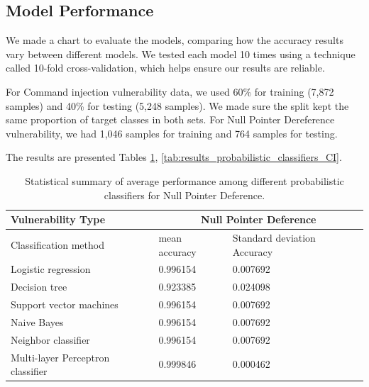\documentclass[journal,a4paper]{IEEEtran}
\begin{document}
\subsection{Model Performance}

We made a chart to evaluate the models, comparing how the accuracy results vary between different models. We tested each model 10 times using a technique called 10-fold cross-validation, which helps ensure our results are reliable.

For Command injection vulnerability data, we used 60\% for training (7,872 samples) and 40\% for testing (5,248 samples). We made sure the split kept the same proportion of target classes in both sets.
For Null Pointer Dereference vulnerability, we had 1,046 samples for training and 764 samples for testing.

The results are presented Tables \ref{tab:results_probabilistic_classifiers_NPD}, \ref{tab:results_probabilistic_classifiers_CI}. 


\begin{table}[!ht]
    \centering
    \caption{Statistical summary of average performance among different probabilistic classifiers for Null Pointer Deference.}
    \begin{tabular}{|l|l|l|}
    \hline
        \textbf{Vulnerability Type} & \multicolumn{2}{|c|}{\textbf{Null Pointer Deference}} \\ \hline
        Classification method &  mean accuracy & Standard deviation Accuracy \\ \hline
        Logistic regression & 0.996154 & 0.007692 \\ \hline
        Decision tree & 0.923385 & 0.024098 \\ \hline
        Support vector machines & 0.996154 & 0.007692 \\ \hline
        Naive Bayes & 0.996154 & 0.007692 \\ \hline
        Neighbor classifier & 0.996154 & 0.007692 \\ \hline
        Multi-layer Perceptron classifier & 0.999846 & 0.000462 \\ \hline
    \end{tabular}
	\label{tab:results_probabilistic_classifiers_NPD}
\end{table}
\end{document}
